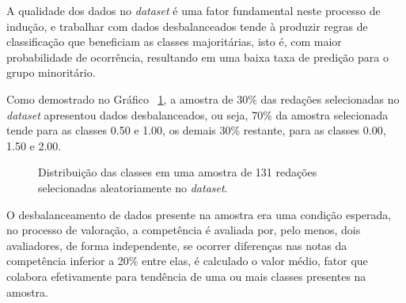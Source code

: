 A qualidade dos dados no \textit{dataset} é uma fator fundamental neste processo de indução, e trabalhar com dados desbalanceados tende à produzir regras de classificação que beneficiam as classes majoritárias, isto é, com maior probabilidade de ocorrência, resultando em uma baixa taxa de predição para o grupo minoritário.

Como demostrado no Gráfico ~\ref{gra:class_unbundling}, a amostra de 30\% das redações selecionadas no \textit{dataset} apresentou dados desbalanceados, ou seja, 70\% da amostra selecionada tende para as classes 0.50 e 1.00, os demais 30\% restante, para as classes 0.00, 1.50 e 2.00. 

\mydata

\begin{figure}[H]
\begin{center}
\caption{Distribuição das classes em uma amostra de 131 redações selecionadas aleatoriamente no \textit{dataset}.}
\label{gra:class_unbundling}
\end{center}
\end{figure}

O desbalanceamento de dados presente na amostra era uma condição esperada, no processo de valoração, a competência é avaliada por, pelo menos, dois avaliadores, de forma independente, se ocorrer diferenças nas notas da competência inferior a 20\% entre elas, é calculado o valor médio, fator que colabora efetivamente para tendência de uma ou mais classes presentes na amostra.

